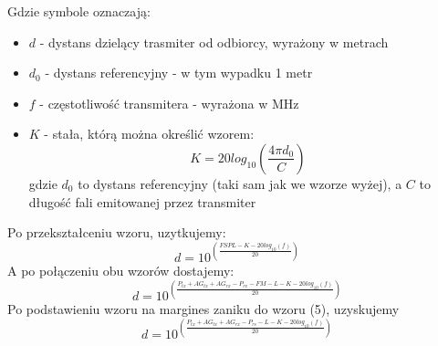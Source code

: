 Gdzie symbole oznaczają:
\begin{itemize}
	\item $d$ - dystans dzielący trasmiter od odbiorcy, wyrażony w metrach
	\item $d_{0}$ - dystans referencyjny -  w tym wypadku 1 metr
	\item $f$ - częstotliwość transmitera - wyrażona w MHz
	\item $K$ - stała, którą można określić wzorem:
	\begin{equation}
	K = 20log_{10}\left(\frac{4\pi d_{0}}{C}\right)
	\end{equation}
	gdzie $d_{0}$ to dystans referencyjny (taki sam jak we wzorze wyżej), a $C$ to długość fali emitowanej przez transmiter
\end{itemize}	  
Po przekształceniu wzoru, uzytkujemy:
\begin{equation}
d = 10^{\left(\frac{FSPL - K - 20log_{10}(f)}{20}\right)}
\end{equation}
A po połączeniu obu wzorów dostajemy:
\begin{equation}
d = 10^{\left(\frac{P_{tx} + AG_{tx} + AG_{rx} - P_{rx} - FM - L - K - 20log_{10}(f)}{20}\right)}
\end{equation}
Po podstawieniu wzoru na margines zaniku do wzoru (5), uzyskujemy
\begin{equation}
d = 10^{\left(\frac{P_{tx} + AG_{tx} + AG_{rx} - P_{rs} - L - K - 20log_{10}(f)}{20}\right)}
\end{equation}